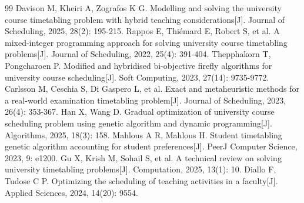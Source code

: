 \begin{thebibliography}{99}
	Davison M, Kheiri A, Zografos K G. Modelling and solving the university course timetabling problem with hybrid teaching considerations[J]. Journal of Scheduling, 2025, 28(2): 195-215.
	Rappos E, Thiémard E, Robert S, et al. A mixed-integer programming approach for solving university course timetabling problems[J]. Journal of Scheduling, 2022, 25(4): 391-404.
	Thepphakorn T, Pongcharoen P. Modified and hybridised bi-objective firefly algorithms for university course scheduling[J]. Soft Computing, 2023, 27(14): 9735-9772.
	Carlsson M, Ceschia S, Di Gaspero L, et al. Exact and metaheuristic methods for a real-world examination timetabling problem[J]. Journal of Scheduling, 2023, 26(4): 353-367.
	Han X, Wang D. Gradual optimization of university course scheduling problem using genetic algorithm and dynamic programming[J]. Algorithms, 2025, 18(3): 158.
	Mahlous A R, Mahlous H. Student timetabling genetic algorithm accounting for student preferences[J]. PeerJ Computer Science, 2023, 9: e1200.
	Gu X, Krish M, Sohail S, et al. A technical review on solving university timetabling problems[J]. Computation, 2025, 13(1): 10.
	Diallo F, Tudose C P. Optimizing the scheduling of teaching activities in a faculty[J]. Applied Sciences, 2024, 14(20): 9554.
\end{thebibliography}

\normalfont
\begin{sloppypar}
	\newpage
\end{sloppypar}



